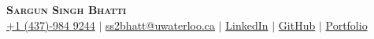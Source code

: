 \begin{center} 
 \textbf{\Huge \scshape Sargun Singh Bhatti} \\ \vspace{3pt} 
 \small 
 \faMobile \hspace{.5pt} \href{tel:+1 (437)-984 9244}{+1 (437)-984 9244} 
 $|$ 
 \faAt \hspace{.5pt} \href{mailto:ss2bhatt@uwaterloo.ca}{ss2bhatt@uwaterloo.ca} 
 $|$ 
 \faLinkedinSquare \hspace{.5pt} \href{www.google.com}{LinkedIn} 
 $|$ 
 \faGithub \hspace{.5pt} \href{www.google.com}{GitHub} 
 $|$ 
 \faGlobe \hspace{.5pt} \href{www.google.com}{Portfolio} 
 \end{center}
